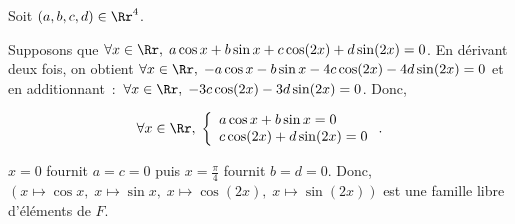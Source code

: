{\begin{enumerate}
{Soit $(a,b,c,d)\in\Rr^4$.

Supposons que $\forall x\in\Rr,\;a\cos x+b\sin x+c\cos(2x)+d\sin(2x)=0$. En dérivant deux fois, on obtient $\forall
x\in\Rr,\;-a\cos x-b\sin x-4c\cos(2x)-4d\sin(2x)=0$ et en additionnant~:~$\forall
x\in\Rr,\;-3c\cos(2x)-3d\sin(2x)=0$. Donc,

$$\forall x\in\Rr,\;\left\{
\begin{array}{l}
a\cos x+b\sin x=0\\
c\cos(2x)+d\sin(2x)=0
\end{array}
\right..$$

$x=0$ fournit $a=c=0$ puis $x=\frac{\pi}{4}$ fournit $b=d=0$. Donc, $(x\mapsto\cos x,\;x\mapsto\sin
x,\;x\mapsto\cos(2x),\;x\mapsto\sin(2x))$ est une famille libre d'éléments de $F$.
}
\end{enumerate}
}
